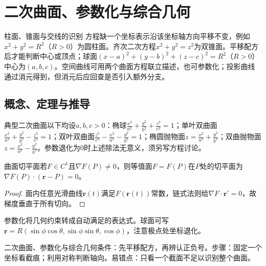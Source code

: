 \section{二次曲面、参数化与综合几何}\label{sec:5:5}

\begin{method}{柱面、锥面与交线的识别}
方程缺一个坐标表示沿该坐标轴方向平移不变，例如$x^2+y^2=R^2$（$R>0$）为圆柱面。齐次二次方程$x^2+y^2=z^2$为双锥面。平移配方后才能判断中心或顶点；球面$(x-a)^2+(y-b)^2+(z-c)^2=R^2$（$R>0$）中心为$(a,b,c)$。空间曲线可用两个曲面方程联立描述，也可参数化；投影曲线通过消元得到，但消元后应回查是否引入额外分支。
\end{method}

\subsection{概念、定理与推导}

\begin{definition}{典型二次曲面}以下均设$a,b,c>0$：椭球$\frac{x^2}{a^2}+\frac{y^2}{b^2}+\frac{z^2}{c^2}=1$；单叶双曲面$\frac{x^2}{a^2}+\frac{y^2}{b^2}-\frac{z^2}{c^2}=1$；双叶双曲面$\frac{z^2}{c^2}-\frac{x^2}{a^2}-\frac{y^2}{b^2}=1$；椭圆抛物面$z=\frac{x^2}{a^2}+\frac{y^2}{b^2}$；双曲抛物面$z=\frac{x^2}{a^2}-\frac{y^2}{b^2}$。参数退化为0时上述除法无意义，须另写方程讨论。\end{definition}
\begin{theorem}{曲面切平面}若$F\in C^1$且$\nabla F(P)\ne0$，则等值面$F=F(P)$在$P$处的切平面为$\nabla F(P)\cdot(\bm r-P)=0$。\end{theorem}
\begin{proof}面内任意光滑曲线$\bm r(t)$满足$F(\bm r(t))$常数，链式法则给$\nabla F\cdot\bm r\prime=0$，故梯度垂直于所有切向。\end{proof}
\begin{extension}参数化将几何约束转成自动满足的表达式。球面可写$\bm r=R(\sin\phi\cos\theta,\sin\phi\sin\theta,\cos\phi)$，注意极点处坐标退化。\end{extension}

\begin{method}{二次曲面、参数化与综合几何}条件：先平移配方，再辨认正负号。步骤：固定一个坐标看截痕；利用对称判断轴向。易错点：只看一个截面不足以识别整个曲面。\end{method}
